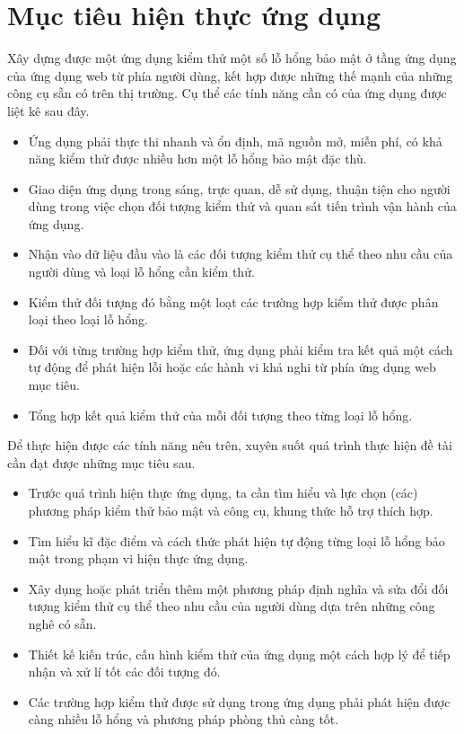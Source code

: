 \section{Mục tiêu hiện thực ứng dụng}
Xây dựng được một ứng dụng kiểm thử một số lỗ hổng bảo mật ở tầng ứng dụng của ứng dụng web từ phía người dùng, kết hợp được những thế mạnh của những công cụ sẵn có trên thị trường. Cụ thể các tính năng cần có của ứng dụng được liệt kê sau đây.
\begin{itemize}
    \item Ứng dụng phải thực thi nhanh và ổn định, mã nguồn mở, miễn phí, có khả năng kiểm thử được nhiều hơn một lỗ hổng bảo mật đặc thù.
    \item Giao diện ứng dụng trong sáng, trực quan, dễ sử dụng, thuận tiện cho người dùng trong việc chọn đối tượng kiểm thử và quan sát tiến trình vận hành của ứng dụng.
    \item Nhận vào dữ liệu đầu vào là các đối tượng kiểm thử cụ thể theo nhu cầu của người dùng và loại lỗ hổng cần kiểm thử.
    \item Kiểm thử đối tượng đó bằng một loạt các trường hợp kiểm thử được phân loại theo loại lỗ hổng.
    \item Đối với từng trường hợp kiểm thử, ứng dụng phải kiểm tra kết quả một cách tự động để phát hiện lỗi hoặc các hành vi khả nghi từ phía ứng dụng web mục tiêu.
    \item Tổng hợp kết quả kiểm thử của mỗi đối tượng theo từng loại lỗ hổng.
\end{itemize}
Để thực hiện được các tính năng nêu trên, xuyên suốt quá trình thực hiện đề tài cần đạt được những mục tiêu sau.
\begin{itemize}
    \item Trước quá trình hiện thực ứng dụng, ta cần tìm hiểu và lực chọn (các) phương pháp kiểm thử bảo mật và công cụ, khung thức hỗ trợ thích hợp.
    \item Tìm hiểu kĩ đặc điểm và cách thức phát hiện tự động từng loại lỗ hổng bảo mật trong phạm vi hiện thực ứng dụng.
    \item Xây dụng hoặc phát triển thêm một phương pháp định nghĩa và sửa đổi đối tượng kiểm thử cụ thể theo nhu cầu của người dùng dựa trên những công nghê có sẵn.
    \item Thiết kế kiến trúc, cấu hình kiểm thử của ứng dụng một cách hợp lý để tiếp nhận và xử lí tốt các đối tượng đó.
    \item Các trường hợp kiểm thử được sử dụng trong ứng dụng phải phát hiện được càng nhiều lỗ hổng và phương pháp phòng thủ càng tốt.
\end{itemize}

